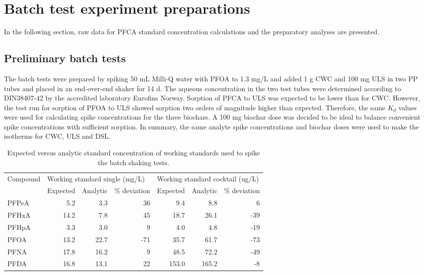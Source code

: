 \chapter{Batch test experiment preparations}\label{appSec:IsothermSetup}
In the following section, raw data for PFCA standard concentration calculations and the preparatory analyses are presented.

\section{Preliminary batch tests}
The batch tests were prepared by spiking 50 mL Milli-Q water with PFOA to 1.3 mg/L and added 1 g CWC and 100 mg ULS in two PP tubes and placed in an end-over-end shaker for 14 d. The aqueous concentration in the two test tubes were determined according to DIN38407-42 by the accredited laboratory Eurofins Norway. Sorption of PFCA to ULS was expected to be lower than for CWC. However, the test run for sorption of PFOA to ULS showed sorption two orders of magnitude higher than expected. Therefore, the same $K_d$ values were used for calculating spike concentrations for the three biochars. A 100 mg biochar dose was decided to be ideal to balance convenient spike concentrations with sufficient sorption. In summary, the same analyte spike concentrations and biochar doses were used to make the isotherms for CWC, ULS and DSL.

\begin{table}[ht]
\centering
\caption{Expected versus analytic standard concentration of working standards used to spike the batch shaking tests.}
\label{apptab:standards}
\begin{tabular}{lrrrrrr}
\toprule
Compound & \multicolumn{3}{l}{Working standard single (mg/L)} & \multicolumn{3}{l}{Working standard cocktail (ug/L)} \\ \cmidrule(l){2-4} \cmidrule(l){5-7} 
 & Expected & Analytic & \% deviation & Expected & Analytic & \% deviation \\ \midrule
PFPeA & 5.2 & 3.3 & 36 & 9.4 & 8.8 & 6 \\
PFHxA & 14.2 & 7.8 & 45 & 18.7 & 26.1 & -39 \\
PFHpA & 3.3 & 3.0 & 9 & 4.0 & 4.8 & -19 \\
PFOA & 13.2 & 22.7 & -71 & 35.7 & 61.7 & -73 \\
PFNA & 17.8 & 16.2 & 9 & 48.5 & 72.2 & -49 \\
PFDA & 16.8 & 13.1 & 22 & 153.0 & 165.2 & -8 \\ \bottomrule
\end{tabular}
\end{table}

